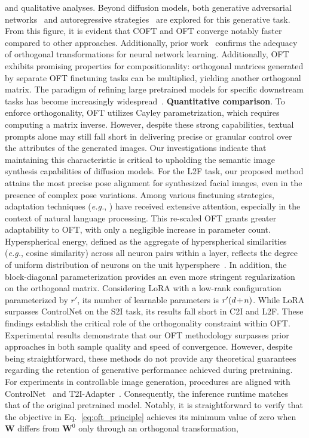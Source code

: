 \begin{itemize}[leftmargin=*,nosep]
and qualitative analyses. Beyond diffusion models, both generative adversarial networks~\cite{reed2016generative,zhang2017stackgan,xu2018attngan,li2019controllable} and autoregressive strategies~\cite{ramesh2021zero,ding2021cogview,wu2022nuwa,yuscaling} are explored for this generative task. From this figure, it is evident that COFT and OFT converge notably faster compared to other approaches. Additionally, prior work~\cite{liu2021orthogonal} confirms the adequacy of orthogonal transformations for neural network learning. Additionally, OFT exhibits promising properties for compositionality: orthogonal matrices generated by separate OFT finetuning tasks can be multiplied, yielding another orthogonal matrix. The paradigm of refining large pretrained models for specific downstream tasks has become increasingly widespread~\cite{devlin2018bert,brown2020language,he2022masked}. \textbf{Quantitative comparison}. To enforce orthogonality, OFT utilizes Cayley parametrization, which requires computing a matrix inverse. However, despite these strong capabilities, textual prompts alone may still fall short in delivering precise or granular control over the attributes of the generated images. Our investigations indicate that maintaining this characteristic is critical to upholding the semantic image synthesis capabilities of diffusion models. For the L2F task, our proposed method attains the most precise pose alignment for synthesized facial images, even in the presence of complex pose variations. Among various finetuning strategies, adaptation techniques (\emph{e.g.}, \cite{hulora2022,houlsby2019parameter,pfeiffer2020adapterfusion}) have received extensive attention, especially in the context of natural language processing. This re-scaled OFT grants greater adaptability to OFT, with only a negligible increase in parameter count. Hyperspherical energy, defined as the aggregate of hyperspherical similarities (\emph{e.g.}, cosine similarity) across all neuron pairs within a layer, reflects the degree of uniform distribution of neurons on the unit hypersphere~\cite{liu2021learning}. In addition, the block-diagonal parameterization provides an even more stringent regularization on the orthogonal matrix. Considering LoRA with a low-rank configuration parameterized by $r'$, its number of learnable parameters is $\thickmuskip=2mu \medmuskip=2mu r'(d+n)$. While LoRA surpasses ControlNet on the S2I task, its results fall short in C2I and L2F. These findings establish the critical role of the orthogonality constraint within OFT. Experimental results demonstrate that our OFT methodology surpasses prior approaches in both sample quality and speed of convergence. However, despite being straightforward, these methods do not provide any theoretical guarantees regarding the retention of generative performance achieved during pretraining. For experiments in controllable image generation, procedures are aligned with ControlNet~\cite{zhang2023adding} and T2I-Adapter~\cite{mou2023t2i}. Consequently, the inference runtime matches that of the original pretrained model. Notably, it is straightforward to verify that the objective in Eq.~\eqref{eq:oft_principle} achieves its minimum value of zero when $\bm{W}$ differs from $\bm{W}^0$ only through an orthogonal transformation, 
\end{itemize}
